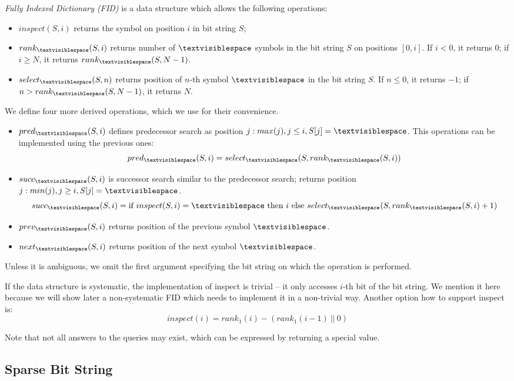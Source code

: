\emph{Fully Indexed Dictionary (FID)} is a data structure which allows the following operations:
\begin{itemize}
	\item \emph{$inspect(S, i)$} returns the symbol on position $i$ in bit string $S$;
	\item \emph{$rank_{\ph}(S, i)$} returns number of $\ph$ symbols in the bit string $S$ on positions $[0, i]$.
	If $i < 0$, it returns $0$; if $i \ge N$, it returns $rank_{\ph}(S, N-1)$.
	\item \emph{$select_{\ph}(S, n)$} returns position of $n$-th symbol $\ph$ in the bit string $S$.
	If $n \le 0$, it returns $-1$; if $n > rank_{\ph}(S, N - 1)$, it returns $N$.
\end{itemize}
We define four more derived operations, which we use for their convenience.
\begin{itemize}
	\item \emph{$pred_{\ph}(S, i)$} defines predecessor search as position $j : max(j), j \le i, S[j] = \ph$.
	This operations can be implemented using the previous ones:
	$$ pred_{\ph}(S, i) = select_{\ph}(S, rank_{\ph}(S, i)) $$
	\item \emph{$succ_{\ph}(S, i)$} is successor search similar to the predecessor search; returns position $j: min(j), j \ge i, S[j] = \ph$.
	$$ succ_{\ph}(S, i) = \textrm{if}\ inspect(S, i) = {\ph}\ \textrm{then}\ i \ \textrm{else}\ select_{\ph}(S, rank_{\ph}(S, i) + 1) $$
	\item \emph{$prev_{\ph}(S, i)$} returns position of the previous symbol $\ph$.
	\item \emph{$next_{\ph}(S, i)$} returns position of the next symbol $\ph$.
\end{itemize}

Unless it is ambiguous, we omit the first argument specifying the bit string on which the operation is performed.

If the data structure is systematic, the implementation of inspect is trivial -- it only accesses $i$-th bit of the bit string.
We mention it here because we will show later a non-systematic FID which needs to implement it in a non-trivial way.
Another option how to support inspect is: $$inspect(i) = rank_1(i) - (rank_1(i-1) \ ||\ 0)$$

Note that not all answers to the queries may exist, which can be expressed by returning a special value.

\subsection{Sparse Bit String}

